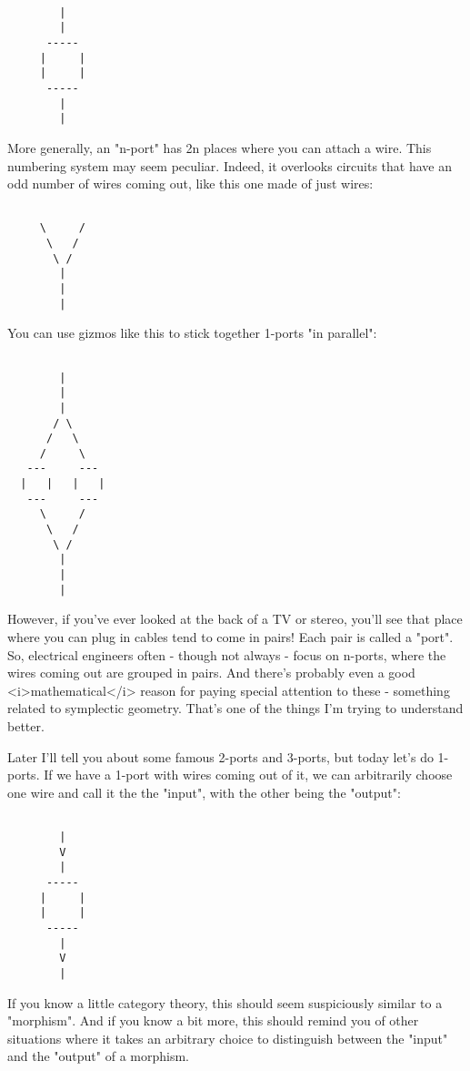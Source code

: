 \begin{verbatim}

        |
        |
      -----
     |     |
     |     |
      -----
        |
        |
\end{verbatim}
    

More generally, an "n-port" has 2n places where you can
attach a wire.  This numbering system may seem peculiar.  Indeed, it
overlooks circuits that have an odd number of wires coming out, like
this one made of just wires:


\begin{verbatim}

     \     /
      \   /
       \ /
        |
        |
        |
\end{verbatim}
    

You can use gizmos like this to stick together 1-ports 
"in parallel":



\begin{verbatim}

        |
        |
        |
       / \
      /   \
     /     \
   ---     ---
  |   |   |   |
   ---     ---
     \     /
      \   /
       \ /
        |
        |
        |
\end{verbatim}
    

However, if you've ever looked at the back of a TV or stereo, you'll
see that place where you can plug in cables tend to come in pairs!
Each pair is called a "port".  So, electrical engineers
often - though not always - focus on n-ports, where the wires coming
out are grouped in pairs.  And there's probably even a good
<i>mathematical</i> reason for paying special attention to these -
something related to symplectic geometry.  That's one of the things
I'm trying to understand better.

Later I'll tell you about some famous 2-ports and 3-ports, but today
let's do 1-ports.  If we have a 1-port with wires coming out of it, we
can arbitrarily choose one wire and call it the the "input",
with the other being the "output":


\begin{verbatim}

        |
        V
        |
      -----
     |     |
     |     |
      -----
        |
        V
        |
\end{verbatim}
    
If you know a little category theory, this should seem suspiciously
similar to a "morphism".  And if you know a bit more, this
should remind you of other situations where it takes an arbitrary
choice to distinguish between the "input" and the
"output" of a morphism.

